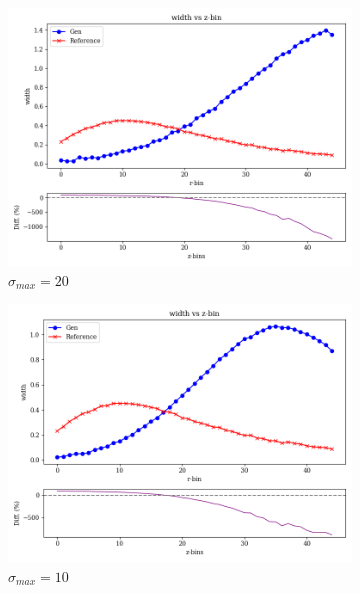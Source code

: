 \begin{figure}[bthp]
    \centering
    \begin{subfigure}[b]{0.23\textwidth}
        \centering
        \includegraphics[width=\textwidth]{Figures/vp20_4.png}
        \caption{$\sigma_{max}=20$}
        \label{fig:vp20_4}
    \end{subfigure}
    \hfill
    \begin{subfigure}[b]{0.23\textwidth}
        \centering
        \includegraphics[width=\textwidth]{Figures/vp10_4.png}
        \caption{$\sigma_{max}=10$}
        \label{fig:vp10_4}
    \end{subfigure}
    \hfill
    \begin{subfigure}[b]{0.23\textwidth}

\end{subfigure}
\end{figure}
